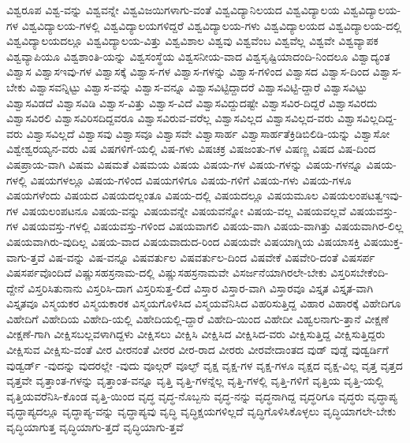 {ವಿಶ್ವರೂಪ
ವಿಶ್ವ-ವನ್ನು
ವಿಶ್ವವನ್ನೇ
ವಿಶ್ವವಿಜಯಿಗಳಾಗು-ವಂತೆ
ವಿಶ್ವವಿದ್ಯಾನಿಲಯದ
ವಿಶ್ವವಿದ್ಯಾಲಯ
ವಿಶ್ವವಿದ್ಯಾಲಯ-ಗಳ
ವಿಶ್ವವಿದ್ಯಾಲಯ-ಗಳಲ್ಲಿ
ವಿಶ್ವವಿದ್ಯಾಲಯಗಳಿದ್ದರೆ
ವಿಶ್ವವಿದ್ಯಾಲಯ-ಗಳು
ವಿಶ್ವವಿದ್ಯಾಲಯದ
ವಿಶ್ವವಿದ್ಯಾಲಯ-ದಲ್ಲಿ
ವಿಶ್ವವಿದ್ಯಾಲಯದಲ್ಲೂ
ವಿಶ್ವವಿದ್ಯಾಲಯ-ವಿತ್ತು
ವಿಶ್ವವಿಶಾಲ
ವಿಶ್ವವು
ವಿಶ್ವವೆಂಬ
ವಿಶ್ವವೆಲ್ಲ
ವಿಶ್ವವೇ
ವಿಶ್ವವ್ಯಾಪಕ
ವಿಶ್ವವ್ಯಾಪಿಯೂ
ವಿಶ್ವಶಾಂತಿ-ಯನ್ನು
ವಿಶ್ವಸಂಸ್ಥೆಯ
ವಿಶ್ವಸನೀಯ-ವಾದ
ವಿಶ್ವಸೃಷ್ಟಿಯಾದಂದಿ-ನಿಂದಲೂ
ವಿಶ್ವಾದ್ಯಂತ
ವಿಶ್ವಾಸ
ವಿಶ್ವಾಸಇವು-ಗಳ
ವಿಶ್ವಾಸಕ್ಕೆ
ವಿಶ್ವಾಸ-ಗಳ
ವಿಶ್ವಾಸ-ಗಳನ್ನು
ವಿಶ್ವಾಸ-ಗಳಿಂದ
ವಿಶ್ವಾಸದ
ವಿಶ್ವಾಸ-ದಿಂದ
ವಿಶ್ವಾಸ-ಬೇಕು
ವಿಶ್ವಾಸವನ್ನಿಟ್ಟು
ವಿಶ್ವಾಸ-ವನ್ನು
ವಿಶ್ವಾಸ-ವನ್ನೂ
ವಿಶ್ವಾಸವಿಟ್ಟಿದ್ದಾದರೆ
ವಿಶ್ವಾಸವಿಟ್ಟಿ-ದ್ದಾರೆ
ವಿಶ್ವಾಸವಿಟ್ಟು
ವಿಶ್ವಾಸವಿಡದೆ
ವಿಶ್ವಾಸವಿಡಿ
ವಿಶ್ವಾಸ-ವಿತ್ತು
ವಿಶ್ವಾಸ-ವಿದೆ
ವಿಶ್ವಾಸವಿದ್ದುದಷ್ಟೇ
ವಿಶ್ವಾಸವಿರ-ದಿದ್ದರೆ
ವಿಶ್ವಾಸವಿರದು
ವಿಶ್ವಾಸವಿರಲಿ
ವಿಶ್ವಾಸವಿರಿಸದಿದ್ದವರೂ
ವಿಶ್ವಾಸವಿರುವ-ವರೆಲ್ಲ
ವಿಶ್ವಾಸವಿಲ್ಲದ
ವಿಶ್ವಾಸವಿಲ್ಲದ-ವರು
ವಿಶ್ವಾಸವಿಲ್ಲದಿದ್ದ-ವರು
ವಿಶ್ವಾಸವಿಲ್ಲದೆ
ವಿಶ್ವಾಸವು
ವಿಶ್ವಾಸವೂ
ವಿಶ್ವಾಸವೇ
ವಿಶ್ವಾಸಾರ್ಹ
ವಿಶ್ವಾಸಾರ್ಹತೆಕ್ರಿಡಿಬಿಲಿಡಿ-ಯನ್ನು
ವಿಶ್ವಾಸೋ
ವಿಶ್ವೇಶ್ವರಯ್ಯನ-ವರು
ವಿಷ
ವಿಷಗಳಿಗೆ-ಯಲ್ಲಿ
ವಿಷ-ಗಳು
ವಿಷಚಕ್ರ
ವಿಷಜಂತು-ಗಳ
ವಿಷಣ್ಣ
ವಿಷದ
ವಿಷ-ದಿಂದ
ವಿಷಪ್ರಾಯ-ವಾಗಿ
ವಿಷಮ
ವಿಷಮತೆ
ವಿಷಮಯ
ವಿಷಯ
ವಿಷಯ-ಗಳ
ವಿಷಯ-ಗಳನ್ನು
ವಿಷಯ-ಗಳನ್ನೂ
ವಿಷಯ-ಗಳಲ್ಲಿ
ವಿಷಯಗಳಲ್ಲೂ
ವಿಷಯ-ಗಳಿಂದ
ವಿಷಯಗಳಿಗೂ
ವಿಷಯ-ಗಳಿಗೆ
ವಿಷಯ-ಗಳು
ವಿಷಯ-ಗಳೂ
ವಿಷಯಗಳೆಂದು
ವಿಷಯದ
ವಿಷಯದಲ್ಲಂತೂ
ವಿಷಯ-ದಲ್ಲಿ
ವಿಷಯದಲ್ಲೂ
ವಿಷಯಮೂಲ
ವಿಷಯಲಂಪಟತ್ವಇವು-ಗಳ
ವಿಷಯಲಂಪಟನೂ
ವಿಷಯ-ವನ್ನು
ವಿಷಯವನ್ನೇ
ವಿಷಯವನ್ನೋ
ವಿಷಯ-ವಲ್ಲ
ವಿಷಯವಲ್ಲವೆ
ವಿಷಯವಸ್ತು-ಗಳ
ವಿಷಯವಸ್ತು-ಗಳಲ್ಲಿ
ವಿಷಯವಸ್ತು-ಗಳಿಂದ
ವಿಷಯವಾಗಲಿ
ವಿಷಯ-ವಾಗಿ
ವಿಷಯ-ವಾಗಿತ್ತು
ವಿಷಯವಾಗಿರ-ಲಿಲ್ಲ
ವಿಷಯವಾಗಿರು-ವುದಿಲ್ಲ
ವಿಷಯ-ವಾದ
ವಿಷಯವಾದುದ-ರಿಂದ
ವಿಷಯವೇ
ವಿಷಯಾಗ್ನಿಯ
ವಿಷಯಾಸಕ್ತಿ
ವಿಷಯುಕ್ತ-ವಾಗು-ತ್ತವೆ
ವಿಷ-ವನ್ನು
ವಿಷ-ವನ್ನೂ
ವಿಷವರ್ತುಲ
ವಿಷವರ್ತುಲ-ದಿಂದ
ವಿಷವೇಕೆ
ವಿಷವೇರಿ-ದಂತೆ
ವಿಷಸರ್ಪ
ವಿಷಸರ್ಪವೊಂದಿದೆ
ವಿಷ್ಣುಸಹಸ್ರನಾಮ-ದಲ್ಲಿ
ವಿಷ್ಣುಸಹಸ್ರನಾಮವೇ
ವಿಸರ್ಜನೆಯಾಗಿರಲೇ-ಬೇಕು
ವಿಸ್ತರಿಸಬೇಕೆಂದಿ-ದ್ದೇನೆ
ವಿಸ್ತರಿಸಿತುನಾನು
ವಿಸ್ತರಿಸಿ-ದಾಗ
ವಿಸ್ತರಿಸುತ್ತ-ಲಿದೆ
ವಿಸ್ತಾರ
ವಿಸ್ತಾರ-ವಾಗಿ
ವಿಸ್ತಾರವೂ
ವಿಸ್ತೃತ
ವಿಸ್ತೃತ-ವಾಗಿ
ವಿಸ್ತೃತವೂ
ವಿಸ್ಮಯಕರ
ವಿಸ್ಮಯಕಾರಕ
ವಿಸ್ಮಯಗೊಳಿಸಿದ
ವಿಸ್ಮಯವೆನಿಸಿದ
ವಿಹರಿಸುತ್ತಿದ್ದ
ವಿಹಾರ
ವಿಹಾರಕ್ಕೆ
ವಿಹೇದಿಗೂ
ವಿಹೇದಿಗೆ
ವಿಹೇದಿಯ
ವಿಹೇದಿ-ಯಲ್ಲಿ
ವಿಹೇದಿಯಲ್ಲಿ-ದ್ದಾರೆ
ವಿಹೇದಿ-ಯಿಂದ
ವಿಹೇದೀ
ವಿಹ್ವಲನಾಗು-ತ್ತಾನೆ
ವೀಕ್ಷಣೆ
ವೀಕ್ಷಣೆ-ಗಾಗಿ
ವೀಕ್ಷಿಸಬಲ್ಲವಳಾಗಿದ್ದಳು
ವೀಕ್ಷಿಸಲು
ವೀಕ್ಷಿಸಿ
ವೀಕ್ಷಿಸಿದ
ವೀಕ್ಷಿಸಿದ-ವರು
ವೀಕ್ಷಿಸುತ್ತಿದ್ದ
ವೀಕ್ಷಿಸುತ್ತಿದ್ದರು
ವೀಕ್ಷಿಸುವ
ವೀಕ್ಷಿಸು-ವಂತೆ
ವೀರ
ವೀರನಂತೆ
ವೀರರ
ವೀರ-ರಾದ
ವೀರರು
ವೀರವೇದಾಂತದ
ವುಡ್
ವುಡ್ಡೆ
ವುಡ್ವರ್ಡಿಗೆ
ವುಡ್ವರ್ಡ್
-ವುದನ್ನು
ವುದರಲ್ಲೇ
-ವುದು
ವೂಲ್ಗರ್
ವೂಲ್ಫ್
ವೃಕ್ಷ
ವೃಕ್ಷ-ಗಳ
ವೃಕ್ಷ-ಗಳೂ
ವೃಕ್ಷದ
ವೃಕ್ಷ-ವಿಲ್ಲ
ವೃತ್ತ
ವೃತ್ತದ
ವೃತ್ತವೇ
ವೃತ್ತಾಂತ-ಗಳನ್ನು
ವೃತ್ತಾಂತ-ವನ್ನೂ
ವೃತ್ತಿ
ವೃತ್ತಿ-ಗಳನ್ನೆಲ್ಲ
ವೃತ್ತಿ-ಗಳಲ್ಲಿ
ವೃತ್ತಿ-ಗಳಿಗೆ
ವೃತ್ತಿಯ
ವೃತ್ತಿ-ಯಲ್ಲಿ
ವೃತ್ತಿಯವರೆನಿಸಿ-ಕೊಂಡ
ವೃತ್ತಿ-ಯಿಂದ
ವೃದ್ಧ
ವೃದ್ಧ-ನೊಬ್ಬನು
ವೃದ್ಧ-ನನ್ನು
ವೃದ್ಧನಾಗಿದ್ದ
ವೃದ್ಧರಿಗೂ
ವೃದ್ಧರು
ವೃದ್ಧಾಪ್ಯ
ವೃದ್ಧಾಪ್ಯದಲ್ಲೂ
ವೃದ್ಧಾಪ್ಯ-ವನ್ನು
ವೃದ್ಧಾಪ್ಯವು
ವೃದ್ಧಿ
ವೃದ್ಧಿಕ್ಷಯಗಳಿಲ್ಲದೆ
ವೃದ್ಧಿಗೊಳಿಸಿಕೊಳ್ಳಲು
ವೃದ್ಧಿಯಾಗಲೇ-ಬೇಕು
ವೃದ್ಧಿಯಾಗುತ್ತ
ವೃದ್ಧಿಯಾಗು-ತ್ತದೆ
ವೃದ್ಧಿಯಾಗು-ತ್ತವೆ
}
